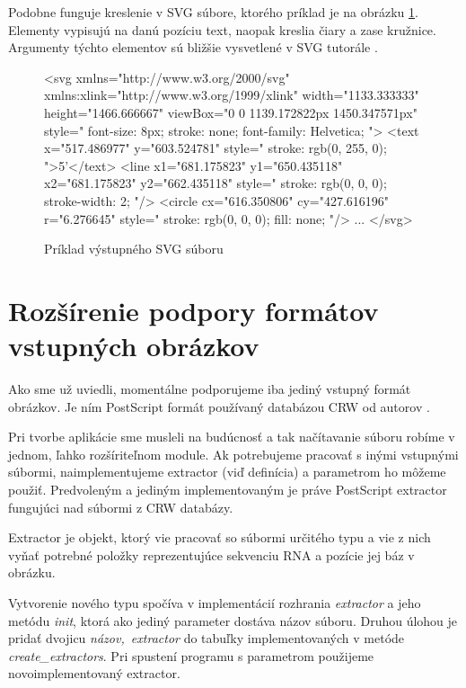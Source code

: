Podobne funguje kreslenie v SVG súbore, ktorého príklad je na obrázku \ref{obr:svg_out}.
Elementy  vypisujú na danú pozíciu text, 
naopak kreslia čiary a  zase kružnice.
Argumenty týchto elementov sú bližšie vysvetlené v SVG tutorále .


\begin{figure}
\begin{code}[fontsize=\scriptsize, frame=none, samepage=true]
<svg xmlns="http://www.w3.org/2000/svg" xmlns:xlink="http://www.w3.org/1999/xlink"
  width="1133.333333" height="1466.666667" viewBox="0 0 1139.172822px 1450.347571px"
  style="
    font-size: 8px; 
    stroke: none; 
    font-family: Helvetica; ">
  <text 
    x="517.486977"
    y="603.524781"
    style="
      stroke: rgb(0, 255, 0); ">5'</text>
  <line 
    x1="681.175823"
    y1="650.435118" 
    x2="681.175823"
    y2="662.435118"
    style="
      stroke: rgb(0, 0, 0); 
      stroke-width: 2; "/>
  <circle 
    cx="616.350806"
    cy="427.616196"
    r="6.276645"
    style="
      stroke: rgb(0, 0, 0); 
      fill: none; "/>
  ...
</svg>
\end{code}
\caption{Príklad výstupného SVG súboru}
\label{obr:svg_out}
\end{figure}





\section{Rozšírenie podpory formátov vstupných obrázkov}
\label{kap:rozsirenie}

Ako sme už uviedli, momentálne podporujeme iba jediný vstupný formát obrázkov.
Je ním PostScript formát používaný databázou CRW od autorov \citet{CRW}.

Pri tvorbe aplikácie sme musleli na budúcnosť a tak načítavanie súboru
robíme v jednom, ľahko rozšíriteľnom module.
Ak potrebujeme pracovať s inými vstupnými súbormi, naimplementujeme extractor
(viď definícia) a parametrom  ho môžeme použiť.
Predvoleným a jediným implementovaným je práve PostScript extractor
fungujúci nad súbormi z CRW databázy.

\begin{definice}
  Extractor je objekt, ktorý vie pracovať so súbormi určitého typu
  a vie z nich vyňať potrebné položky reprezentujúce sekvenciu RNA
  a pozície jej báz v obrázku.
\end{definice}

\renewcommand{\tagt}[1]{\mbox{\textit{#1}}}

Vytvorenie nového typu spočíva v implementácií rozhrania \tagt{extractor}
a jeho metódu \tagt{init}, ktorá ako jediný parameter dostáva názov súboru.
Druhou úlohou je pridať dvojicu \tagt{názov, extractor} do tabuľky
implementovaných v metóde \tagt{create\_extractors}.
Pri spustení programu s parametrom  použijeme
novoimplementovaný extractor.


